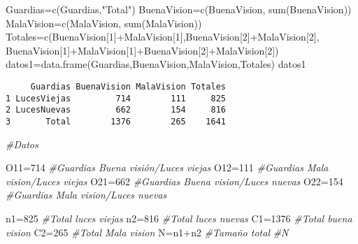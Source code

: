 \documentclass[
  a4paper,
  oneside,
  openany]{book}
\newenvironment{Shaded}{\begin{snugshade}}{\end{snugshade}}
\newcommand{\CommentTok}[1]{\textcolor[rgb]{0.56,0.35,0.01}{\textit{#1}}}
\newcommand{\DecValTok}[1]{\textcolor[rgb]{0.00,0.00,0.81}{#1}}
\newcommand{\FunctionTok}[1]{\textcolor[rgb]{0.00,0.00,0.00}{#1}}
\newcommand{\NormalTok}[1]{#1}
\newcommand{\OtherTok}[1]{\textcolor[rgb]{0.56,0.35,0.01}{#1}}
\newcommand{\SpecialCharTok}[1]{\textcolor[rgb]{0.00,0.00,0.00}{#1}}
\newcommand{\StringTok}[1]{\textcolor[rgb]{0.31,0.60,0.02}{#1}}
\begin{document}
\begin{Shaded}
\begin{Highlighting}[]
\NormalTok{Guardias}\OtherTok{=}\FunctionTok{c}\NormalTok{(Guardias,}\StringTok{"Total"}\NormalTok{)}
\NormalTok{BuenaVision}\OtherTok{=}\FunctionTok{c}\NormalTok{(BuenaVision, }\FunctionTok{sum}\NormalTok{(BuenaVision))}
\NormalTok{MalaVision}\OtherTok{=}\FunctionTok{c}\NormalTok{(MalaVision, }\FunctionTok{sum}\NormalTok{(MalaVision))}
\NormalTok{Totales}\OtherTok{=}\FunctionTok{c}\NormalTok{(BuenaVision[}\DecValTok{1}\NormalTok{]}\SpecialCharTok{+}\NormalTok{MalaVision[}\DecValTok{1}\NormalTok{],BuenaVision[}\DecValTok{2}\NormalTok{]}\SpecialCharTok{+}\NormalTok{MalaVision[}\DecValTok{2}\NormalTok{],}
\NormalTok{           BuenaVision[}\DecValTok{1}\NormalTok{]}\SpecialCharTok{+}\NormalTok{MalaVision[}\DecValTok{1}\NormalTok{]}\SpecialCharTok{+}\NormalTok{BuenaVision[}\DecValTok{2}\NormalTok{]}\SpecialCharTok{+}\NormalTok{MalaVision[}\DecValTok{2}\NormalTok{])}
\NormalTok{datos1}\OtherTok{=}\FunctionTok{data.frame}\NormalTok{(Guardias,BuenaVision,MalaVision,Totales)}
\NormalTok{datos1}
\end{Highlighting}
\end{Shaded}

\begin{verbatim}
     Guardias BuenaVision MalaVision Totales
1 LucesViejas         714        111     825
2 LucesNuevas         662        154     816
3       Total        1376        265    1641
\end{verbatim}

\begin{Shaded}
\begin{Highlighting}[]
\CommentTok{\#Datos}

\NormalTok{O11}\OtherTok{=}\DecValTok{714}    \CommentTok{\#Guardias Buena visión/Luces viejas}
\NormalTok{O12}\OtherTok{=}\DecValTok{111}    \CommentTok{\#Guardias Mala vision/Luces viejas}
\NormalTok{O21}\OtherTok{=}\DecValTok{662}    \CommentTok{\#Guardias Buena vision/Luces nuevas}
\NormalTok{O22}\OtherTok{=}\DecValTok{154}    \CommentTok{\#Guardias Mala vision/Luces nuevas}

\NormalTok{n1}\OtherTok{=}\DecValTok{825}      \CommentTok{\#Total luces viejas         }
\NormalTok{n2}\OtherTok{=}\DecValTok{816}      \CommentTok{\#Total luces nuevas}
\NormalTok{C1}\OtherTok{=}\DecValTok{1376}     \CommentTok{\#Total buena vision}
\NormalTok{C2}\OtherTok{=}\DecValTok{265}      \CommentTok{\#Total Mala vision}
\NormalTok{N}\OtherTok{=}\NormalTok{n1}\SpecialCharTok{+}\NormalTok{n2     }\CommentTok{\#Tamaño total }
\CommentTok{\#N}
\end{Highlighting}
\end{Shaded}
\end{document}
